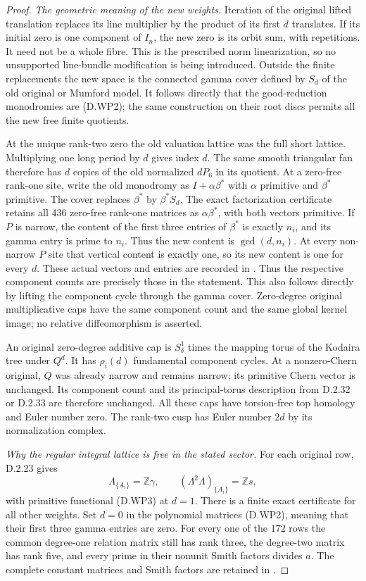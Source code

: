 \begin{proof}
\emph{The geometric meaning of the new weights.}
Iteration of the original lifted translation replaces
its line multiplier by the product of its first $d$
translates. If its initial zero is one component of
$I_n$, the new zero is its orbit sum, with repetitions.
It need not be a whole fibre. This is the prescribed
norm linearization, so no unsupported line-bundle
modification is being introduced.
Outside the finite replacements the new space is
the connected gamma cover defined by $S_d$ of the
old original or Mumford model. It follows directly
that the good-reduction monodromies are (D.WP2);
the same construction on their root discs permits
all the new free finite quotients.

At the unique rank-two zero the old valuation
lattice was the full short lattice. Multiplying
one long period by $d$ gives index $d$. The same
smooth triangular fan therefore has $d$ copies
of the old normalized $dP_6$ in its quotient.
At a zero-free rank-one site, write the old
monodromy as $I+\alpha\beta^*$ with $\alpha$
primitive and $\beta^*$ primitive. The cover
replaces $\beta^*$ by $\beta^*S_d$.
The exact factorization certificate retains all $436$
zero-free rank-one matrices as $\alpha\beta^*$, with
both vectors primitive. If $P$ is narrow, the content
of the first three entries of $\beta^*$ is exactly
$n_i$, and its gamma entry is prime to $n_i$. Thus
the new content is $\gcd(d,n_i)$. At every non-narrow
$P$ site that vertical content is exactly one, so
its new content is one for every $d$. These actual
vectors and entries are recorded in
.
Thus the respective component counts are precisely
those in the statement. This also follows directly
by lifting the component cycle through the gamma
cover. Zero-degree original multiplicative caps
have the same component count and the same global
kernel image; no relative diffeomorphism is asserted.

An original zero-degree additive cap is
$S^1_\delta$ times the mapping torus of the Kodaira
tree under $Q^d$. It has $\rho_i(d)$ fundamental
component cycles. At a nonzero-Chern original, $Q$
was already narrow and remains narrow; its
primitive Chern vector is unchanged. Its component
count and its principal-torus description from
D.2.32 or D.2.33 are therefore unchanged.
All these caps have torsion-free top homology and
Euler number zero. The rank-two cusp has Euler
number $2d$ by its normalization complex.

\emph{Why the regular integral lattice is free in the stated sector.}
For each original row, D.2.23 gives
\[
 \Lambda_{\{A_i\}}=\mathbb Z\gamma,\qquad
 (\Lambda^2\Lambda)_{\{A_i\}}=\mathbb Zs,
\]
with primitive functional (D.WP3) at $d=1$.
There is a finite exact certificate for all other
weights. Set $d=0$ in the polynomial matrices
(D.WP2), meaning that their first three gamma
entries are zero. For every one of the $172$ rows
the common degree-one relation matrix still has
rank three, the degree-two matrix has rank five,
and every prime in their nonunit Smith factors
divides $a$. The complete constant matrices and
Smith factors are retained in
.


\end{proof}
